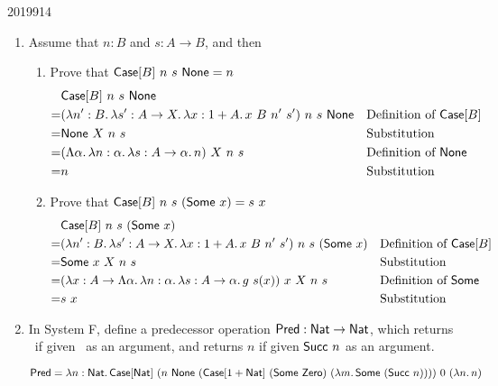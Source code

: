 \documentclass[10pt,\jkfside,a4paper]{article}
\begin{document}
\begin{enumerate}
\begin{examquestion}{2019}{9}{14}
\begin{enumerate}[label=(\roman*)]
            \item Assume that $n: B$ and $s: A \to B$, and then

            \begin{enumerate}[label=(\Roman*)]

                \item Prove that $\mathsf{Case}[B]\ n\ s\ \mathsf{None} = n$
                \begin{align*}
                     & \mathsf{Case}[B]\ n\ s\ \mathsf{None} \\
                    =& (\lambda n': B\ldotp \lambda s': A \to X\ldotp \lambda x: 1 + A\ldotp x\ B\ n'\ s')\ n\ s\ \mathsf{None} && \text{Definition of $\mathsf{Case}[B]$} \\
                    =& \mathsf{None}\ X\ n\ s && \text{Substitution} \\
                    =& (\Lambda \alpha\ldotp \lambda n: \alpha\ldotp \lambda s: A \to \alpha\ldotp n)\ X\ n\ s && \text{Definition of $\mathsf{None}$} \\
                    =& n && \text{Substitution}
                \end{align*}

                \item Prove that $\mathsf{Case}[B]\ n\ s\ (\mathsf{Some}\ x) = s\ x$
                \begin{align*}
                     & \case[B]\ n\ s\ (\some\ x) \\
                    =& (\lambda n': B\ldotp \lambda s': A \to X\ldotp \lambda x: 1 + A\ldotp x\ B\ n'\ s')\ n\ s\ (\some\ x) && \text{Definition of $\case[B]$} \\
                    =& \some\ x\ X\ n\ s && \text{Substitution} \\
                    =& (\lambda x: A \to \Lambda \alpha\ldotp \lambda n: \alpha\ldotp \lambda s: A \to \alpha\ldotp g\ s(x))\ x\ X\ n\ s && \text{Definition of $\some$} \\
                    =& s\ x && \text{Substitution}
                \end{align*}

            \end{enumerate}

            \item In System F, define a predecessor operation $\mathsf{Pred}: \mathsf{Nat} \to \mathsf{Nat}$, which returns \zero\ if given \zero\ as an argument, and returns $n$ if given $\mathsf{Succ}\ n$ as an argument.

            \[
                \mathsf{Pred} = \lambda n: \mathsf{Nat}\ldotp \mathsf{Case}[\mathsf{Nat}]\ (n\ \mathsf{None}\ (\mathsf{Case}[1 + \mathsf{Nat}]\ (\mathsf{Some}\ \mathsf{Zero})\ (\lambda m\ldotp \mathsf{Some}\ (\mathsf{Succ}\ n))))\ 0\ (\lambda n\ldotp n)
            \]


\end{enumerate}
\end{examquestion}
\end{enumerate}
\end{document}

